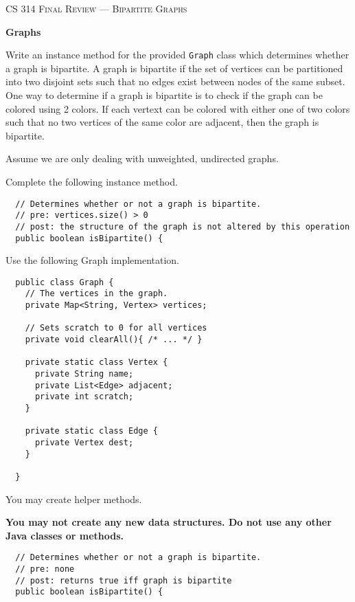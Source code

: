 \documentclass[12pt,letter]{article}
\begin{document}
\noindent\textsc{\large CS 314 Final Review --- Bipartite Graphs}

\vspace{6pt}
\noindent\textbf{Graphs}

\vspace{2pt}
\noindent Write an instance method for the provided \texttt{Graph} class which determines whether a graph is bipartite.
A graph is bipartite if the set of vertices can be partitioned into two disjoint sets such that no edges exist between nodes of the same subset.
One way to determine if a graph is bipartite is to check if the graph can be colored using 2 colors. If each vertext can be colored
with either one of two colors such that no two vertices of the same color are adjacent, then the graph is bipartite. 

\vspace{4pt} 
\noindent Assume we are only dealing with unweighted, undirected graphs.

\vspace{6pt}
\noindent Complete the following instance method.
\begin{verbatim}
  // Determines whether or not a graph is bipartite.
  // pre: vertices.size() > 0
  // post: the structure of the graph is not altered by this operation
  public boolean isBipartite() {
\end{verbatim}

\vspace{4pt}
\noindent Use the following Graph implementation.

\begin{verbatim}
  public class Graph {
    // The vertices in the graph.
    private Map<String, Vertex> vertices;

    // Sets scratch to 0 for all vertices
    private void clearAll(){ /* ... */ }

    private static class Vertex {
      private String name;
      private List<Edge> adjacent;
      private int scratch;
    }

    private static class Edge {
      private Vertex dest;
    }    

  }
\end{verbatim}

\noindent You may create helper methods.

\noindent \textbf{You may not create any new data structures. \newline Do not use any other Java classes or methods.}

\clearpage
\begin{verbatim}
  // Determines whether or not a graph is bipartite.
  // pre: none
  // post: returns true iff graph is bipartite
  public boolean isBipartite() {
\end{verbatim}
 
\end{document}
